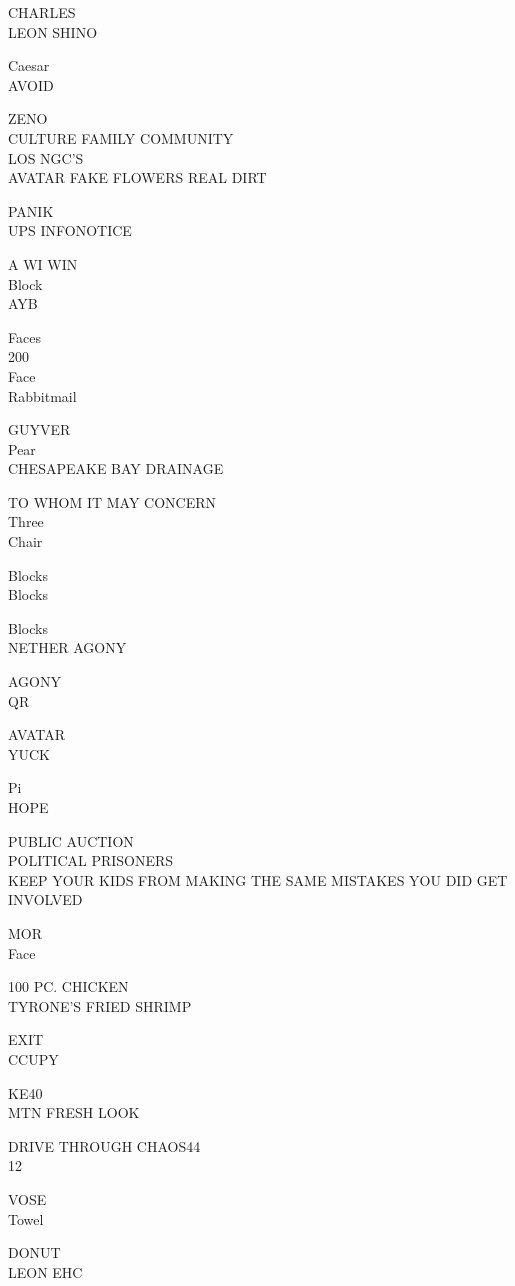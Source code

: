 \documentclass[10pt,letterpaper]{article}
\begin{document}
CHARLES\\
LEON SHINO

Caesar\\
AVOID

ZENO\\
CULTURE FAMILY COMMUNITY\\
LOS NGC'S\\
AVATAR FAKE FLOWERS REAL DIRT

PANIK\\
UPS INFONOTICE

A WI WIN\\
Block\\
AYB

Faces\\
200\\
Face\\
Rabbitmail

GUYVER\\
Pear\\
CHESAPEAKE BAY DRAINAGE

TO WHOM IT MAY CONCERN\\
Three\\
Chair

Blocks\\
Blocks

Blocks\\
NETHER AGONY

AGONY\\
QR

AVATAR\\
YUCK

Pi\\
HOPE

PUBLIC AUCTION\\
POLITICAL PRISONERS\\
KEEP YOUR KIDS FROM MAKING THE SAME MISTAKES YOU DID GET INVOLVED

MOR\\
Face

100 PC. CHICKEN\\
TYRONE'S FRIED SHRIMP

EXIT\\
CCUPY

KE40\\
MTN FRESH LOOK

DRIVE THROUGH CHAOS44\\
12

VOSE\\
Towel

DONUT\\
LEON EHC
\end{document}
